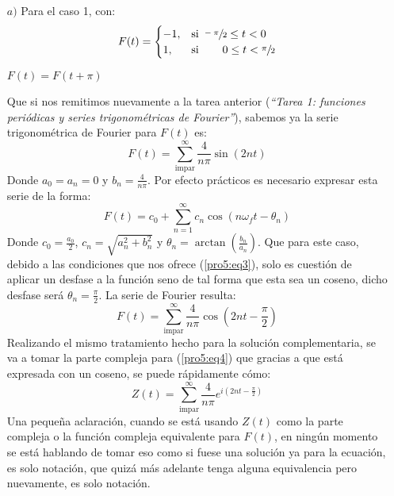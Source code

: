 \begin{multicols}{2}
\begin{itemize}
    \item[$a)$] Para el caso 1, con:
    \begin{equation*}
        F(t) =
        \begin{cases}
        -1,&\text{si } \sfrac{-\pi}{2} \leq t < 0\\
        1,&\text{si } \hspace{18pt} 0 \leq t < \sfrac{\pi}{2}
        \end{cases}
    \end{equation*}
    \begin{center}$F(t)=F(t+\pi)$\end{center}
    Que si nos remitimos nuevamente a la tarea anterior (\textit{``Tarea 1: funciones periódicas y series trigonométricas de Fourier''}), sabemos ya la serie trigonométrica de Fourier para $F(t)$ es:
    \begin{equation}
        F(t) = \sum_{\mathrm{impar}}^{\infty} \frac{4}{n\pi} \sin\left(2nt\right)\label{pro5:eq3}
    \end{equation}
    Donde $a_0 = a_n = 0$ y $b_n = \frac{4}{n\pi}$. Por efecto prácticos es necesario expresar esta serie de la forma:
    \begin{equation*}
        F(t) = c_0 + \sum_{n=1}^{\infty} c_n \cos\left(n\omega_f t - \theta_n\right)
    \end{equation*}
    Donde $c_0 = \frac{a_0}{2}$, $c_n = \sqrt{a_{n}^{2} + b_{n}^{2}}$ y $\theta_n = \arctan\left(\frac{b_n}{a_n}\right)$. Que para este caso, debido a las condiciones que nos ofrece (\ref{pro5:eq3}), solo es cuestión de aplicar un desfase a la función seno de tal forma que esta sea un coseno, dicho desfase será $\theta_n = \frac{\pi}{2}$. La serie de Fourier resulta:
    \begin{equation}
        F(t) = \sum_{\mathrm{impar}}^{\infty} \frac{4}{n\pi} \cos\left(2nt - \frac{\pi}{2}\right) \label{pro5:eq4}
    \end{equation}
    Realizando el mismo tratamiento hecho para la solución complementaria, se va a tomar la parte compleja para (\ref{pro5:eq4}) que gracias a que está expresada con un coseno, se puede rápidamente cómo:
    \begin{equation*}
        Z(t) = \sum_{\mathrm{impar}}^{\infty} \frac{4}{n\pi} e^{i\left(2nt - \frac{\pi}{2}\right)}
    \end{equation*}
    Una pequeña aclaración, cuando se está usando $Z(t)$ como la parte compleja o la función compleja equivalente para $F(t)$, en ningún momento se está hablando de tomar eso como si fuese una solución ya para la ecuación, es solo notación, que quizá más adelante tenga alguna equivalencia pero nuevamente, es solo notación.


\end{itemize}
\end{multicols}
